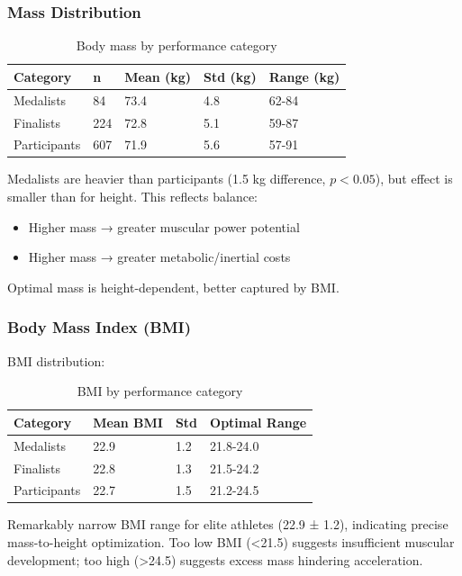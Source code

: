 \subsubsection{Mass Distribution}

\begin{table}[H]
\centering
\caption{Body mass by performance category}
\begin{tabular}{@{}lllll@{}}
\toprule
\textbf{Category} & \textbf{n} & \textbf{Mean (kg)} & \textbf{Std (kg)} & \textbf{Range (kg)} \\
\midrule
Medalists & 84 & 73.4 & 4.8 & 62-84 \\
Finalists & 224 & 72.8 & 5.1 & 59-87 \\
Participants & 607 & 71.9 & 5.6 & 57-91 \\
\bottomrule
\end{tabular}
\end{table}

Medalists are heavier than participants (1.5 kg difference, $p < 0.05$), but effect is smaller than for height. This reflects balance:
\begin{itemize}
    \item Higher mass → greater muscular power potential
    \item Higher mass → greater metabolic/inertial costs
\end{itemize}

Optimal mass is height-dependent, better captured by BMI.

\subsubsection{Body Mass Index (BMI)}

BMI distribution:

\begin{table}[H]
\centering
\caption{BMI by performance category}
\begin{tabular}{@{}llll@{}}
\toprule
\textbf{Category} & \textbf{Mean BMI} & \textbf{Std} & \textbf{Optimal Range} \\
\midrule
Medalists & 22.9 & 1.2 & 21.8-24.0 \\
Finalists & 22.8 & 1.3 & 21.5-24.2 \\
Participants & 22.7 & 1.5 & 21.2-24.5 \\
\bottomrule
\end{tabular}
\end{table}

Remarkably narrow BMI range for elite athletes (22.9 ± 1.2), indicating precise mass-to-height optimization. Too low BMI (<21.5) suggests insufficient muscular development; too high (>24.5) suggests excess mass hindering acceleration.

